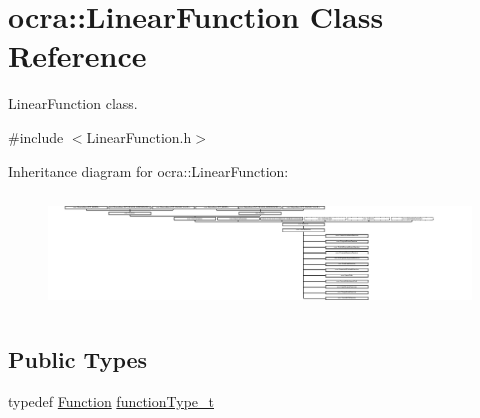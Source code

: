 \hypertarget{classocra_1_1LinearFunction}{}\section{ocra\+:\+:Linear\+Function Class Reference}
\label{classocra_1_1LinearFunction}


Linear\+Function class.  




{\ttfamily \#include $<$Linear\+Function.\+h$>$}

Inheritance diagram for ocra\+:\+:Linear\+Function\+:\begin{figure}[H]
\begin{center}
\leavevmode
\includegraphics[height=3.066023cm]{de/d3a/classocra_1_1LinearFunction}
\end{center}
\end{figure}
\subsection*{Public Types}
\begin{DoxyCompactItemize}
\item 
typedef \hyperlink{classocra_1_1Function}{Function} \hyperlink{classocra_1_1LinearFunction_adaf7f13c522f2001ced48c64a361c2e6}{function\+Type\+\_\+t}
\end{DoxyCompactItemize}

